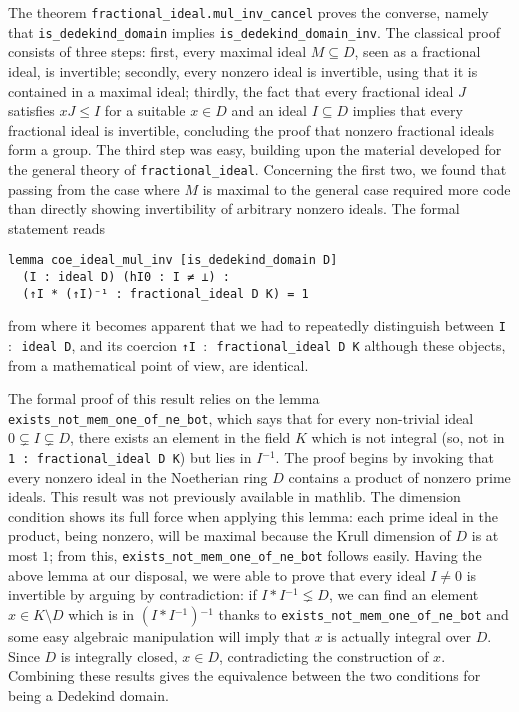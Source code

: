 \documentclass[sn-mathphys]{sn-jnl}%
\newcommand{\inv}{\ensuremath{{}^{-1}}}
\newcommand{\lean}[1]{\texttt{#1}\xspace}
\newcommand{\mathlib}{\textsf{mathlib}\xspace}
\begin{document}
The theorem \lean{fractional\_ideal.mul\_inv\_cancel} proves the converse, namely that \lean{is\_dedekind\_domain} implies \lean{is\_dedekind\_domain\_inv}. The classical proof consists of three steps: first, every maximal ideal $M\subseteq D$, seen as a fractional ideal, is invertible;
secondly, every nonzero ideal is invertible, using that it is contained in a maximal ideal;
thirdly, the fact that every fractional ideal $J$ satisfies $xJ\leq I$ for a suitable $x\in D$ and an ideal $I\subseteq D$ implies that every fractional ideal is invertible, concluding the proof that nonzero fractional ideals form a group.
The third step was easy, building upon the material developed for the general theory of \lean{fractional\_ideal}. Concerning the first two, we found that passing from the case where $M$ is maximal to the general case required more code than directly showing invertibility of arbitrary nonzero ideals. The formal statement reads
\begin{lstlisting}
lemma coe_ideal_mul_inv [is_dedekind_domain D] 
  (I : ideal D) (hI0 : I ≠ ⊥) :
  (↑I * (↑I)⁻¹ : fractional_ideal D K) = 1
\end{lstlisting}
from where it becomes apparent that we had to repeatedly distinguish between \lean{I $:$ ideal D}, and its coercion \lean{↑I $:$ fractional\_ideal D K} although these objects, from a mathematical point of view, are identical.

The formal proof of this result relies on the lemma \lean{exists\_not\_mem\_one\-\_of\-\_ne\-\_bot}, which says that for every non-trivial ideal $0\subsetneq I\subsetneq D$, there exists an element in the field $K$ which is not integral (so, not in \lean{1 : fractional\_ideal D K}) but lies in $I\inv$. The proof begins by invoking that every nonzero ideal in the Noetherian ring $D$ contains a product of nonzero prime ideals. This result was not previously available in \mathlib.
The dimension condition shows its full force when applying this lemma:
each prime ideal in the product, being nonzero, will be maximal because the Krull dimension of $D$ is at most $1$; from this, \lean{exists\_not\_mem\_one\_of\_ne\_bot} follows easily. Having the above lemma at our disposal,
we were able to prove that every ideal $I\ne 0$ is invertible by arguing by contradiction: if $I\ast I\inv \lneq D$, we can find an element $x\in K\setminus D$ which is in $(I\ast I\inv)\inv$ thanks to \lean{exists\_not\_mem\_one\_of\_ne\_bot} and some easy algebraic manipulation will imply that $x$ is actually integral over $D$. Since $D$ is integrally closed, $x \in D$, contradicting the construction of $x$. Combining these results gives the equivalence between the two conditions for being a Dedekind domain.
\end{document}
